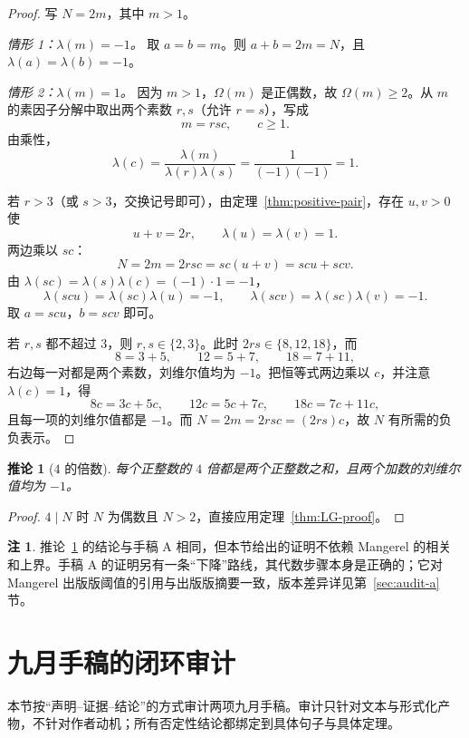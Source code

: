 \documentclass[11pt,a4paper]{ctexart}
\theoremstyle{plain}
\newtheorem{corollary}[theorem]{推论}
\theoremstyle{definition}
\newtheorem{remark}[theorem]{注}
\newcommand{\li}{\lambda}
\newcommand{\Om}{\Omega}
\begin{document}
\begin{proof}
写 $N=2m$，其中 $m>1$。

\smallskip
\noindent\textit{情形 1：$\li(m)=-1$。}
取 $a=b=m$。则 $a+b=2m=N$，且 $\li(a)=\li(b)=-1$。

\smallskip
\noindent\textit{情形 2：$\li(m)=1$。}
因为 $m>1$，$\Om(m)$ 是正偶数，故 $\Om(m)\ge2$。从 $m$ 的素因子分解中取出两个素数 $r,s$（允许 $r=s$），写成
\[
  m=rsc,\qquad c\ge1.
\]
由乘性，
\[
  \li(c)=\frac{\li(m)}{\li(r)\li(s)}=\frac{1}{(-1)(-1)}=1.
\]

若 $r>3$（或 $s>3$，交换记号即可），由定理~\ref{thm:positive-pair}，存在 $u,v>0$ 使
\[
  u+v=2r,\qquad \li(u)=\li(v)=1.
\]
两边乘以 $sc$：
\[
  N=2m=2rsc=sc(u+v)=scu+scv.
\]
由 $\li(sc)=\li(s)\li(c)=(-1)\cdot1=-1$，
\[
  \li(scu)=\li(sc)\li(u)=-1,\qquad
  \li(scv)=\li(sc)\li(v)=-1.
\]
取 $a=scu$，$b=scv$ 即可。

若 $r,s$ 都不超过 $3$，则 $r,s\in\{2,3\}$。此时 $2rs\in\{8,12,18\}$，而
\[
  8=3+5,\qquad 12=5+7,\qquad 18=7+11,
\]
右边每一对都是两个素数，刘维尔值均为 $-1$。把恒等式两边乘以 $c$，并注意 $\li(c)=1$，得
\[
  8c=3c+5c,\qquad 12c=5c+7c,\qquad 18c=7c+11c,
\]
且每一项的刘维尔值都是 $-1$。而 $N=2m=2rsc=(2rs)c$，故 $N$ 有所需的负负表示。
\end{proof}

\begin{corollary}[$4$ 的倍数]
\label{cor:four}
每个正整数的 $4$ 倍都是两个正整数之和，且两个加数的刘维尔值均为 $-1$。
\end{corollary}

\begin{proof}
$4\mid N$ 时 $N$ 为偶数且 $N>2$，直接应用定理~\ref{thm:LG-proof}。
\end{proof}

\begin{remark}
\label{rem:four}
推论~\ref{cor:four} 的结论与手稿 A 相同，但本节给出的证明不依赖 Mangerel 的相关和上界。手稿 A 的证明另有一条“下降”路线，其代数步骤本身是正确的；它对 Mangerel 出版版阈值的引用与出版版摘要一致，版本差异详见第~\ref{sec:audit-a} 节。
\end{remark}

\section{九月手稿的闭环审计}
\label{sec:audit}

本节按“声明--证据--结论”的方式审计两项九月手稿。审计只针对文本与形式化产物，不针对作者动机；所有否定性结论都绑定到具体句子与具体定理。
\end{document}
